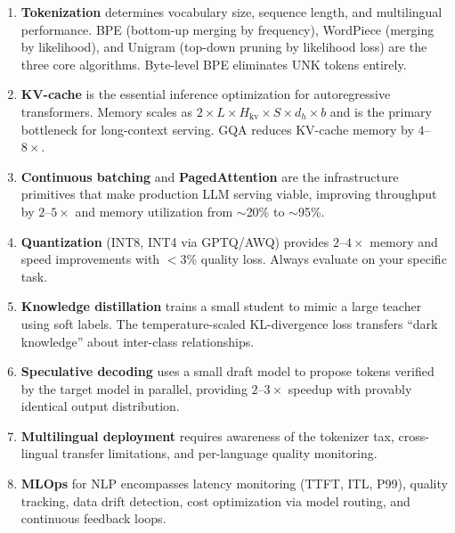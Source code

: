 \begin{enumerate}
    \item \textbf{Tokenization} determines vocabulary size, sequence length, and
          multilingual performance.  BPE (bottom-up merging by frequency), WordPiece
          (merging by likelihood), and Unigram (top-down pruning by likelihood loss)
          are the three core algorithms.  Byte-level BPE eliminates UNK tokens entirely.

    \item \textbf{KV-cache} is the essential inference optimization for autoregressive
          transformers.  Memory scales as $2 \times L \times H_{\text{kv}} \times S
          \times d_h \times b$ and is the primary bottleneck for long-context serving.
          GQA reduces KV-cache memory by $4$--$8\times$.

    \item \textbf{Continuous batching} and \textbf{PagedAttention} are the infrastructure
          primitives that make production LLM serving viable, improving throughput by
          $2$--$5\times$ and memory utilization from $\sim$20\% to $\sim$95\%.

    \item \textbf{Quantization} (INT8, INT4 via GPTQ/AWQ) provides $2$--$4\times$
          memory and speed improvements with $<$3\% quality loss.  Always evaluate on
          your specific task.

    \item \textbf{Knowledge distillation} trains a small student to mimic a large
          teacher using soft labels.  The temperature-scaled KL-divergence loss
          transfers ``dark knowledge'' about inter-class relationships.

    \item \textbf{Speculative decoding} uses a small draft model to propose tokens
          verified by the target model in parallel, providing $2$--$3\times$ speedup
          with provably identical output distribution.

    \item \textbf{Multilingual deployment} requires awareness of the tokenizer tax,
          cross-lingual transfer limitations, and per-language quality monitoring.

    \item \textbf{MLOps} for NLP encompasses latency monitoring (TTFT, ITL, P99),
          quality tracking, data drift detection, cost optimization via model routing,
          and continuous feedback loops.
\end{enumerate}

